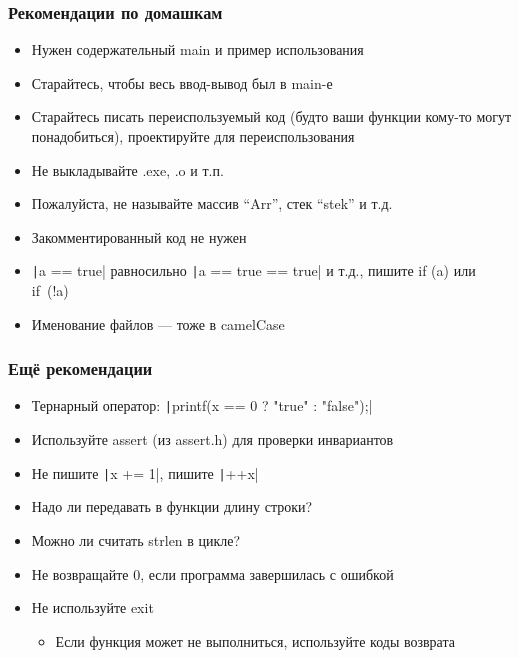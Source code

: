 \documentclass[aspectratio=169]{beamer}
\begin{document}
\begin{frame}[fragile]
    \frametitle{Рекомендации по домашкам}
    \begin{itemize}
        \item Нужен содержательный main и пример использования
        \item Старайтесь, чтобы весь ввод-вывод был в main-е
        \item Старайтесь писать переиспользуемый код (будто ваши функции кому-то могут понадобиться), проектируйте для переиспользования
        \item Не выкладывайте .exe, .o и т.п.
        \item Пожалуйста, не называйте массив \enquote{Arr}, стек \enquote{stek} и т.д.
        \item Закомментированный код не нужен
        \item \texttt|a == true| равносильно \texttt|a == true == true| и т.д., пишите if (a) или if~(!a)
        \item Именование файлов --- тоже в camelCase
    \end{itemize}
\end{frame}

\begin{frame}[fragile]
    \frametitle{Ещё рекомендации}
    \begin{itemize}
        \item Тернарный оператор: \texttt|printf(x == 0 ? "true" :  "false");|
        \item Используйте assert (из assert.h) для проверки инвариантов
        \item Не пишите \texttt|x += 1|, пишите \texttt|++x|
        \item Надо ли передавать в функции длину строки?
        \item Можно ли считать strlen в цикле?
        \item Не возвращайте 0, если программа завершилась с ошибкой
        \item Не используйте exit
              \begin{itemize}
                  \item Если функция может не выполниться, используйте коды возврата
              \end{itemize}
    \end{itemize}
\end{frame}
\end{document}
